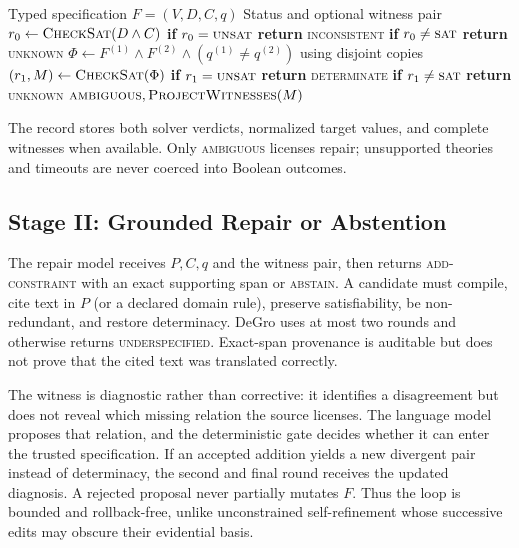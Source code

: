 \documentclass[sigconf,anonymous]{aamas}
\begin{document}
\begin{algorithm}[H]
\caption{Target-determinacy verification}
\label{alg:verify}
\footnotesize
\begin{algorithmic}[1]
\Require Typed specification $F=(V,D,C,q)$
\Ensure Status and optional witness pair
\State $r_0 \gets \Call{CheckSat}{D\land C}$
\State \textbf{if} $r_0=\textsc{unsat}$ \textbf{return} \textsc{inconsistent}
\State \textbf{if} $r_0\neq\textsc{sat}$ \textbf{return} \textsc{unknown}
\State $\Phi\gets F^{(1)}\land F^{(2)}\land(q^{(1)}\neq q^{(2)})$ using disjoint copies
\State $(r_1,M) \gets \Call{CheckSat}{\Phi}$
\State \textbf{if} $r_1=\textsc{unsat}$ \textbf{return} \textsc{determinate}
\State \textbf{if} $r_1\neq\textsc{sat}$ \textbf{return} \textsc{unknown}
\State \Return $\textsc{ambiguous},\Call{ProjectWitnesses}{M}$
\end{algorithmic}
\end{algorithm}

The record stores both solver verdicts, normalized target values, and complete witnesses when available.  Only \textsc{ambiguous} licenses repair; unsupported theories and timeouts are never coerced into Boolean outcomes.

\subsection{Stage II: Grounded Repair or Abstention}
The repair model receives $P,C,q$ and the witness pair, then returns \textsc{add-constraint} with an exact supporting span or \textsc{abstain}.  A candidate must compile, cite text in $P$ (or a declared domain rule), preserve satisfiability, be non-redundant, and restore determinacy.  DeGro uses at most two rounds and otherwise returns \textsc{underspecified}.  Exact-span provenance is auditable but does not prove that the cited text was translated correctly.

The witness is diagnostic rather than corrective: it identifies a disagreement but does not reveal which missing relation the source licenses.  The language model proposes that relation, and the deterministic gate decides whether it can enter the trusted specification.  If an accepted addition yields a new divergent pair instead of determinacy, the second and final round receives the updated diagnosis.  A rejected proposal never partially mutates $F$.  Thus the loop is bounded and rollback-free, unlike unconstrained self-refinement whose successive edits may obscure their evidential basis.
\end{document}
